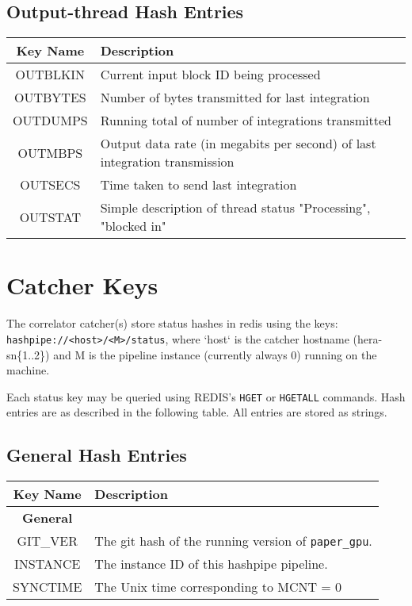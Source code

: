 \documentclass{article}
\begin{document}
\subsection{Output-thread Hash Entries}

\begin{centering}
\begin{tabular}{c p{}}
\hline
Key Name & Description \\
\hline
\hline
\hline
OUTBLKIN & Current input block ID being processed \\
OUTBYTES & Number of bytes transmitted for last integration \\
OUTDUMPS & Running total of number of integrations transmitted \\
OUTMBPS  & Output data rate (in megabits per second) of last integration transmission \\
OUTSECS  & Time taken to send last integration \\
OUTSTAT  & Simple description of thread status "Processing", "blocked in"

\end{tabular}
\end{centering}

\section{Catcher Keys}

The correlator catcher(s) store status hashes in redis using the keys: \texttt{hashpipe://<host>/<M>/status}, where `host` is the catcher hostname (hera-sn\{1..2\}) and M is the pipeline instance (currently always 0) running on the machine.

Each status key may be queried using REDIS's \texttt{HGET} or \texttt{HGETALL} commands. Hash entries are as described in the following table. All entries are stored as strings.
\\

\subsection{General Hash Entries}

\begin{centering}
\begin{tabular}{c p{}}
\hline
Key Name & Description \\
\hline
\hline
\textbf{General} & \\
GIT\_VER & The git hash of the running version of \texttt{paper\_gpu}. \\
INSTANCE & The instance ID of this hashpipe pipeline. \\
SYNCTIME & The Unix time corresponding to MCNT = 0 \\
\end{tabular}
\end{centering}
\end{document}
